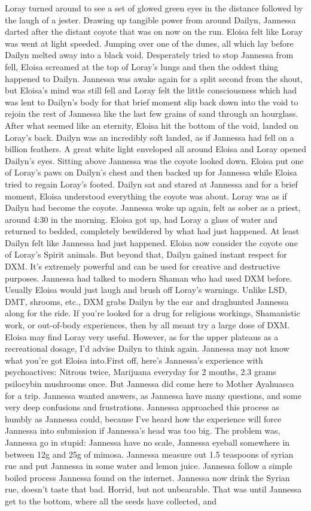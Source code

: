 \documentclass[12pt]{book}
\begin{document}
Loray turned around to see a set of glowed green eyes in the distance followed by the laugh of a jester. Drawing up tangible power from around Dailyn, Jannessa darted after the distant coyote that was on now on the run. Eloisa felt like Loray was went at light speeded. Jumping over one of the dunes, all which lay before Dailyn melted away into a black void. Desperately tried to stop Jannessa from fell, Eloisa screamed at the top of Loray's lungs and then the oddest thing happened to Dailyn. Jannessa was awake again for a split second from the shout, but Eloisa's mind was still fell and Loray felt the little consciousness which had was lent to Dailyn's body for that brief moment slip back down into the void to rejoin the rest of Jannessa like the last few grains of sand through an hourglass. After what seemed like an eternity, Eloisa hit the bottom of the void, landed on Loray's back. Dailyn was an incredibly soft landed, as if Jannessa had fell on a billion feathers. A great white light enveloped all around Eloisa and Loray opened Dailyn's eyes. Sitting above Jannessa was the coyote looked down. Eloisa put one of Loray's paws on Dailyn's chest and then backed up for Jannessa while Eloisa tried to regain Loray's footed. Dailyn sat and stared at Jannessa and for a brief moment, Eloisa understood everything the coyote was about. Loray was as if Dailyn had become the coyote. Jannessa woke up again, felt as sober as a priest, around 4:30 in the morning. Eloisa got up, had Loray a glass of water and returned to bedded, completely bewildered by what had just happened. At least Dailyn felt like Jannessa had just happened. Eloisa now consider the coyote one of Loray's Spirit animals. But beyond that, Dailyn gained instant respect for DXM. It's extremely powerful and can be used for creative and destructive purposes. Jannessa had talked to modern Shaman who had used DXM before. Usually Eloisa would just laugh and brush off Loray's warnings. Unlike LSD, DMT, shrooms, etc., DXM grabs Dailyn by the ear and draghunted Jannessa along for the ride. If you're looked for a drug for religious workings, Shamanistic work, or out-of-body experiences, then by all meant try a large dose of DXM. Eloisa may find Loray very useful. However, as for the upper plateaus as a recreational dosage, I'd advise Dailyn to think again. Jannessa may not know what you're got Eloisa into.First off, here's Jannessa's experience with psychoactives: Nitrous twice, Marijuana everyday for 2 months, 2.3 grams psilocybin mushrooms once. But Jannessa did come here to Mother Ayahuasca for a trip. Jannessa wanted answers, as Jannessa have many questions, and some very deep confusions and frustrations. Jannessa approached this process as humbly as Jannessa could, because I've heard how the experience will force Jannessa into submission if Jannessa's head was too big. The problem was, Jannessa go in stupid: Jannessa have no scale, Jannessa eyeball somewhere in between 12g and 25g of mimosa. Jannessa measure out 1.5 teaspoons of syrian rue and put Jannessa in some water and lemon juice. Jannessa follow a simple boiled process Jannessa found on the internet. Jannessa now drink the Syrian rue, doesn't taste that bad. Horrid, but not unbearable. That was until Jannessa get to the bottom, where all the seeds have collected, and 
\end{document}

